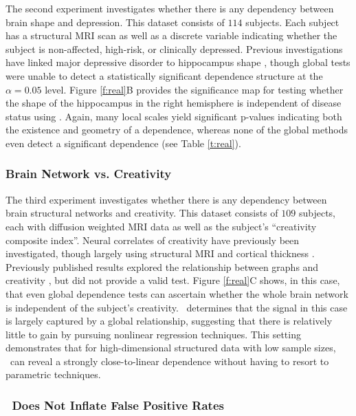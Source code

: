 \documentclass[11pt]{article}
\begin{document}
The second experiment investigates whether there is any dependency between brain shape and depression. 
This  dataset consists of $114$ subjects. Each subject has a structural MRI scan as well as a discrete variable indicating whether the subject is non-affected, high-risk, or clinically depressed.  
% 
Previous investigations have linked major depressive disorder to hippocampus shape \cite{ParkEtAl2008,PosenerEtAl2003}, though global tests were unable to detect a statistically significant dependence structure at the $\alpha=0.05$ level.
% 
Figure \ref{f:real}{\color{magenta}B} provides the significance map for testing whether the shape of the hippocampus in the right hemisphere is independent of disease status using \Mgc. Again, many local scales yield significant p-values indicating both the existence and geometry of a dependence, whereas none of the global methods even detect a significant dependence  (see Table \ref{t:real}). 



\subsubsection*{Brain Network vs. Creativity}

The third experiment investigates whether there is any dependency between brain structural networks and creativity.  
% 
This dataset consists of $109$ subjects, each with diffusion weighted MRI data as well as the subject's ``creativity composite index''. 
Neural correlates of creativity have previously been investigated, though largely using structural MRI and cortical thickness \cite{Jung2009}.  Previously published results explored the relationship between graphs and  creativity \cite{Koutra15a}, but did not provide a valid test. 
% 
Figure \ref{f:real}{\color{magenta}C} shows, in this case,  that even global dependence tests can ascertain whether the whole brain network is independent of the subject's creativity.  \Mgc~determines that the signal in this case is largely captured by a global relationship, suggesting that there is relatively little to gain by pursuing nonlinear regression techniques. This setting demonstrates that for high-dimensional structured data with low sample sizes, \Mgc~can  reveal a strongly close-to-linear dependence without having to resort to parametric techniques.


\subsubsection*{\Mgc~Does Not Inflate False Positive Rates} 
\end{document}
